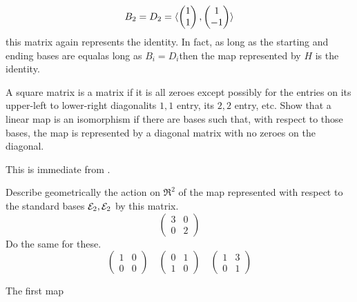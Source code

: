 \begin{exercises}
\begin{answer}
\begin{equation*}
        B_2=D_2=\langle\begin{pmatrix} 1 \\ 1 \end{pmatrix},\begin{pmatrix} 1 \\ -1 \end{pmatrix}\rangle
      \end{equation*}
      this matrix again represents the identity.
      In fact, as long as the starting and ending bases 
      are equal\Dash as long as
      \( B_i=D_i \)\Dash then the map represented by $H$ is the identity.
    \end{answer}
  \recommended \item 
    A square matrix is a 
    matrix if it is all zeroes
    except possibly for the entries on its upper-left to lower-right
    diagonal\Dash its \( 1,1 \) entry, its \( 2,2 \) entry, etc.
    Show that a linear map is an isomorphism if there are bases such that,
    with respect to those bases, the map is represented by a diagonal matrix 
    with no zeroes on the diagonal.
    \begin{answer}
      This is immediate from .
    \end{answer}
  \item 
    Describe geometrically the action on \( \Re^2 \) of
    the map represented with respect to the standard 
    bases ${\cal E}_2,{\cal E}_2$ by this matrix.
    \begin{equation*}
      \begin{pmatrix}
        3  &0  \\
        0  &2
      \end{pmatrix}
    \end{equation*}
    Do the same for these.
    \begin{equation*}
      \begin{pmatrix}
        1  &0  \\
        0  &0
      \end{pmatrix}
      \quad
      \begin{pmatrix}
        0  &1  \\
        1  &0
      \end{pmatrix}
      \quad
      \begin{pmatrix}
        1  &3  \\
        0  &1
      \end{pmatrix}
    \end{equation*}
    \begin{answer}
      The first map 
      \begin{equation*}

\end{equation*}
\end{answer}
\end{exercises}
